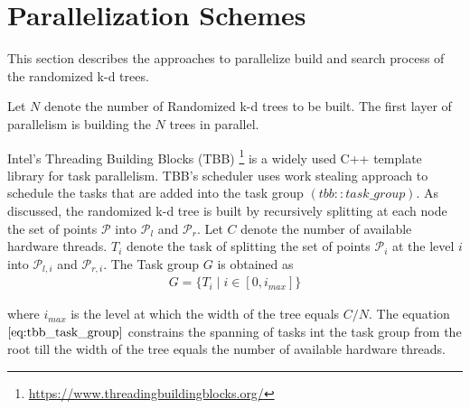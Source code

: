 \section{Parallelization Schemes}
  \label{sec:parallelisation_schemes}

This section describes the approaches to parallelize build and search process of the randomized k-d trees. 

Let $N$ denote the number of Randomized k-d trees to be built. The first layer of parallelism is building the $N$ trees in parallel.

Intel's Threading Building Blocks (TBB) \footnote{\url{https://www.threadingbuildingblocks.org/}} is a widely used C++ template library for task parallelism. TBB's scheduler uses work stealing approach to schedule the tasks that are added into the task group $(tbb::task\_group)$. As discussed, the randomized k-d tree is built by recursively splitting at each node the set of points $\mathcal{P}$ into $\mathcal{P}_{l}$ and $\mathcal{P}_{r}$. Let $C$ denote the number of available hardware threads. $T_i$ denote the task of splitting the set of points $\mathcal{P}_{i}$ at the level $i$ into $\mathcal{P}_{l,i}$ and $\mathcal{P}_{r,i}$. The Task group $G$ is obtained as
\begin{align}
G=\lbrace T_i \mid i \in [0,i_{max}] \rbrace
\end{align} 
\label{eq:tbb_task_group} 

where $i_{max}$ is the level at which the width of the tree equals $C/N$. The equation $\ref{eq:tbb_task_group}$  constrains the spanning of tasks int the task group from the root till the width of the tree equals the number of available hardware threads. 




